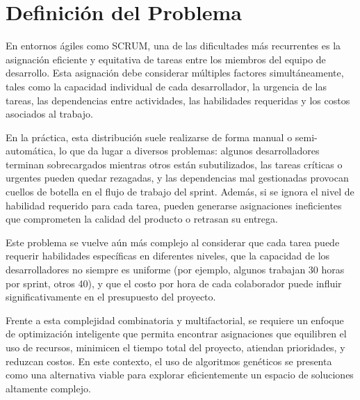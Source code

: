 \section{Definición del Problema}
En entornos ágiles como SCRUM, una de las dificultades más recurrentes es la asignación eficiente y equitativa de tareas entre los miembros del equipo de desarrollo. Esta asignación debe considerar múltiples factores simultáneamente, tales como la capacidad individual de cada desarrollador, la urgencia de las tareas, las dependencias entre actividades, las habilidades requeridas y los costos asociados al trabajo.

En la práctica, esta distribución suele realizarse de forma manual o semi-automática, lo que da lugar a diversos problemas: algunos desarrolladores terminan sobrecargados mientras otros están subutilizados, las tareas críticas o urgentes pueden quedar rezagadas, y las dependencias mal gestionadas provocan cuellos de botella en el flujo de trabajo del sprint. Además, si se ignora el nivel de habilidad requerido para cada tarea, pueden generarse asignaciones ineficientes que comprometen la calidad del producto o retrasan su entrega.

Este problema se vuelve aún más complejo al considerar que cada tarea puede requerir habilidades específicas en diferentes niveles, que la capacidad de los desarrolladores no siempre es uniforme (por ejemplo, algunos trabajan 30 horas por sprint, otros 40), y que el costo por hora de cada colaborador puede influir significativamente en el presupuesto del proyecto.

Frente a esta complejidad combinatoria y multifactorial, se requiere un enfoque de optimización inteligente que permita encontrar asignaciones que equilibren el uso de recursos, minimicen el tiempo total del proyecto, atiendan prioridades, y reduzcan costos. En este contexto, el uso de algoritmos genéticos se presenta como una alternativa viable para explorar eficientemente un espacio de soluciones altamente complejo.


